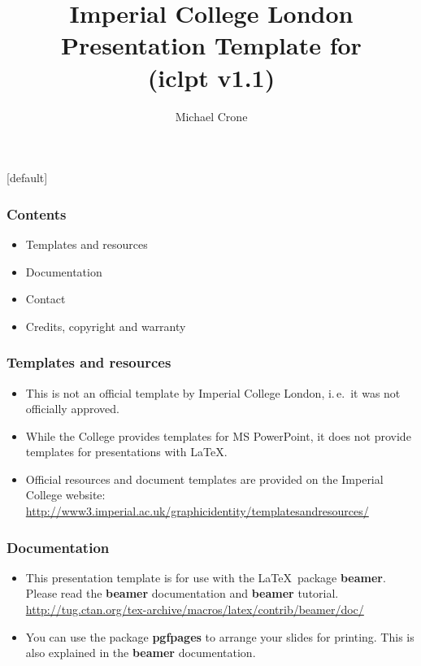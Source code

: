 \documentclass[t]{beamer}
\author{Michael Crone}
\title[Imperial College London :: Systems and Synthetic Biology]{Imperial
College London\\Presentation Template for \LaTeXe\\
(iclpt v1.1)}
\makeatletter
\newenvironment{withoutheadline}{
        \setbeamertemplate{headline}[default]
        \def\beamer@entrycode{\vspace*{-\headheight}}
    }{}
\makeatother
\begin{document}
\begin{withoutheadline}
\frame{\maketitle}
\end{withoutheadline}

\begin{frame}
\frametitle{Contents}
	\begin{itemize}
	\item Templates and resources
	\item Documentation
	\item Contact
	\item Credits, copyright and warranty
	\end{itemize}
\end{frame}

\begin{frame}
\frametitle{Templates and resources}
	\begin{itemize}
	\item This is not an official template by Imperial 
	College London,
	i.\,e.\ it was not officially approved.
	\item While the College provides templates for 
	MS PowerPoint, it does not provide templates 
	for presentations with \LaTeX. 
	\item Official resources and document 
	templates are provided on the Imperial 
	College website:\\	
	\url{
http://www3.imperial.ac.uk/graphicidentity/templatesandresources/ }
	\end{itemize}
\end{frame}



\begin{frame}
\frametitle{Documentation}
	\begin{itemize}
	\item This presentation template is for use 
	with the \LaTeX\ package \textbf{beamer}.
	Please read the \textbf{beamer} documentation 
	and  \textbf{beamer} tutorial.\\	
\url{
http://tug.ctan.org/tex-archive/macros/latex/contrib/beamer/doc/}
	\item You can use the package \textbf{pgfpages} 
	to arrange your slides for printing. This is also explained
	in the \textbf{beamer} documentation.
	\end{itemize}
\end{frame}
\end{document}
